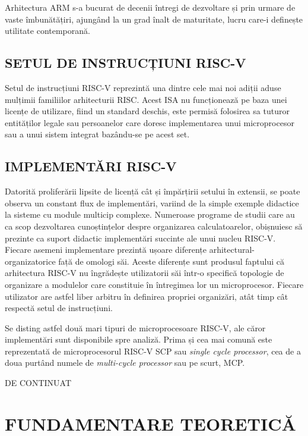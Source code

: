 \documentclass[12pt]{article}
\begin{document}
Arhitectura ARM s-a bucurat de decenii întregi de dezvoltare și prin urmare de vaste îmbunătățiri, ajungând la un grad înalt de maturitate, lucru care-i definește utilitate contemporană.

\subsection{SETUL DE INSTRUCȚIUNI RISC-V}
Setul de instrucțiuni RISC-V reprezintă una dintre cele mai noi adiții aduse mulțimii familiilor arhitecturii RISC. Acest ISA nu funcționează pe baza unei licențe de utilizare, fiind un standard deschis, este permisă folosirea sa tuturor entităților legale sau persoanelor care doresc implementarea unui microprocesor sau a unui sistem integrat bazându-se pe acest set.

\subsection{IMPLEMENTĂRI  RISC-V}
Datorită proliferării lipsite de licență cât și împărțirii setului în extensii, se poate observa un constant flux de implementări, variind de la simple exemple didactice la sisteme cu module multicip complexe. Numeroase programe de studii care au ca scop dezvoltarea cunoștințelor despre organizarea calculatoarelor, obișnuiesc să prezinte ca suport didactic implementări succinte ale unui nucleu RISC-V. Fiecare asemeni implementare prezintă ușoare diferențe arhitectural-organizatorice față de omologi săi. Aceste diferențe sunt produsul faptului că arhitectura RISC-V nu îngrădește utilizatorii săi într-o specifică topologie de organizare a modulelor care constituie în întregimea lor un microprocesor. Fiecare utilizator are astfel liber arbitru în definirea propriei organizări, atât timp cât respectă setul de instrucțiuni.

Se disting astfel două mari tipuri de microprocesoare RISC-V, ale căror implementări sunt disponibile spre analiză. Prima și cea mai comună este reprezentată de microprocesorul RISC-V SCP sau \textit{single cycle processor}, cea de a doua purtând numele de \textit{multi-cycle processor} sau pe scurt, MCP.


\begin{center}
\vspace*{60mm}
DE CONTINUAT
\end{center}

\newpage
\section{\centering FUNDAMENTARE TEORETICĂ}
\bigbreak
\end{document}
